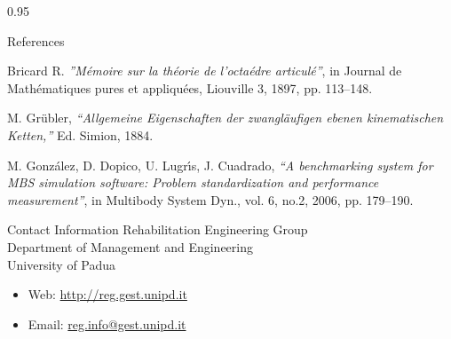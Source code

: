 \documentclass[final]{beamer}
\newlength{\onecolwid}
\begin{document}
\begin{frame}[t]
\begin{columns}[t]
\begin{column}{0.95\onecolwid}
\begin{block}{References}

\begin{thebibliography}{99}

 Bricard R. \textit{''M{\'e}moire sur la th{\'e}orie de l'octa{\'e}dre articul{\'e}''}, in Journal de Math{\'e}matiques pures et appliqu{\'e}es, Liouville 3, 1897, pp. 113–148. 

 M. Gr{\"u}bler, \textit{``Allgemeine Eigenschaften der zwangl{\"a}ufigen ebenen kinematischen Ketten,''} Ed. Simion, 1884.

 M. Gonz{\'a}lez, D. Dopico, U. Lugr{\'\i}s, J. Cuadrado, \textit{``A benchmarking system for MBS simulation software: Problem standardization and performance measurement''}, 	in Multibody System Dyn., vol. 6, no.2,  2006, pp. 179--190.

\end{thebibliography}

\end{block}
\vspace{30cm}

\begin{alertblock}{Contact Information}
Rehabilitation Engineering Group\\Department of Management and Engineering\\ University of Padua

\begin{itemize}
\item Web: \href{http://reg.gest.unipd.it}{http://reg.gest.unipd.it}
\item Email: \href{mailto:reg.info@gest.unipd.it}{reg.info@gest.unipd.it}
\end{itemize}

\end{alertblock}


\end{column} %

\end{columns} %

\end{frame} %
\end{document}

